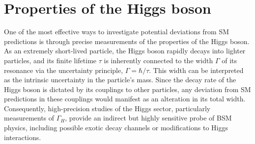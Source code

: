 
\section{Properties of the Higgs boson}



One of the most effective ways to investigate potential deviations from SM predictions is through precise measurements of the properties of the Higgs boson. As an extremely short-lived particle, the Higgs boson rapidly decays into lighter particles, and its finite lifetime \( \tau \) is inherently connected to the width \( \Gamma \) of its resonance via the uncertainty principle, \( \Gamma = \hbar / \tau \). This width can be interpreted as the intrinsic uncertainty in the particle's mass. Since the decay rate of the Higgs boson is dictated by its couplings to other particles, any deviation from SM predictions in these couplings would manifest as an alteration in its total width. Consequently, high-precision studies of the Higgs sector, particularly measurements of \( \Gamma_H \), provide an indirect but highly sensitive probe of BSM physics, including possible exotic decay channels or modifications to Higgs interactions.

